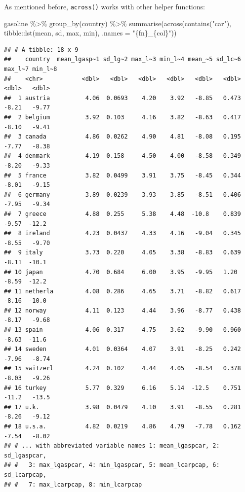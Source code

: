 \documentclass[
]{article}
\newenvironment{Shaded}{\begin{snugshade}}{\end{snugshade}}
\newcommand{\AttributeTok}[1]{\textcolor[rgb]{0.77,0.63,0.00}{#1}}
\newcommand{\FunctionTok}[1]{\textcolor[rgb]{0.00,0.00,0.00}{#1}}
\newcommand{\NormalTok}[1]{#1}
\newcommand{\SpecialCharTok}[1]{\textcolor[rgb]{0.00,0.00,0.00}{#1}}
\newcommand{\StringTok}[1]{\textcolor[rgb]{0.31,0.60,0.02}{#1}}
\begin{document}
As mentioned before, \texttt{across()} works with other helper functions:

\begin{Shaded}
\begin{Highlighting}[]
\NormalTok{gasoline }\SpecialCharTok{\%\textgreater{}\%}
  \FunctionTok{group\_by}\NormalTok{(country) }\SpecialCharTok{\%\textgreater{}\%}
  \FunctionTok{summarise}\NormalTok{(}\FunctionTok{across}\NormalTok{(}\FunctionTok{contains}\NormalTok{(}\StringTok{"car"}\NormalTok{), tibble}\SpecialCharTok{::}\FunctionTok{lst}\NormalTok{(mean, sd, max, min), }\AttributeTok{.names =} \StringTok{"\{fn\}\_\{col\}"}\NormalTok{))}
\end{Highlighting}
\end{Shaded}

\begin{verbatim}
## # A tibble: 18 x 9
##    country  mean_lgasp~1 sd_lg~2 max_l~3 min_l~4 mean_~5 sd_lc~6 max_l~7 min_l~8
##    <chr>           <dbl>   <dbl>   <dbl>   <dbl>   <dbl>   <dbl>   <dbl>   <dbl>
##  1 austria          4.06  0.0693    4.20    3.92   -8.85   0.473   -8.21   -9.77
##  2 belgium          3.92  0.103     4.16    3.82   -8.63   0.417   -8.10   -9.41
##  3 canada           4.86  0.0262    4.90    4.81   -8.08   0.195   -7.77   -8.38
##  4 denmark          4.19  0.158     4.50    4.00   -8.58   0.349   -8.20   -9.33
##  5 france           3.82  0.0499    3.91    3.75   -8.45   0.344   -8.01   -9.15
##  6 germany          3.89  0.0239    3.93    3.85   -8.51   0.406   -7.95   -9.34
##  7 greece           4.88  0.255     5.38    4.48  -10.8    0.839   -9.57  -12.2 
##  8 ireland          4.23  0.0437    4.33    4.16   -9.04   0.345   -8.55   -9.70
##  9 italy            3.73  0.220     4.05    3.38   -8.83   0.639   -8.11  -10.1 
## 10 japan            4.70  0.684     6.00    3.95   -9.95   1.20    -8.59  -12.2 
## 11 netherla         4.08  0.286     4.65    3.71   -8.82   0.617   -8.16  -10.0 
## 12 norway           4.11  0.123     4.44    3.96   -8.77   0.438   -8.17   -9.68
## 13 spain            4.06  0.317     4.75    3.62   -9.90   0.960   -8.63  -11.6 
## 14 sweden           4.01  0.0364    4.07    3.91   -8.25   0.242   -7.96   -8.74
## 15 switzerl         4.24  0.102     4.44    4.05   -8.54   0.378   -8.03   -9.26
## 16 turkey           5.77  0.329     6.16    5.14  -12.5    0.751  -11.2   -13.5 
## 17 u.k.             3.98  0.0479    4.10    3.91   -8.55   0.281   -8.26   -9.12
## 18 u.s.a.           4.82  0.0219    4.86    4.79   -7.78   0.162   -7.54   -8.02
## # ... with abbreviated variable names 1: mean_lgaspcar, 2: sd_lgaspcar,
## #   3: max_lgaspcar, 4: min_lgaspcar, 5: mean_lcarpcap, 6: sd_lcarpcap,
## #   7: max_lcarpcap, 8: min_lcarpcap
\end{verbatim}
\end{document}

